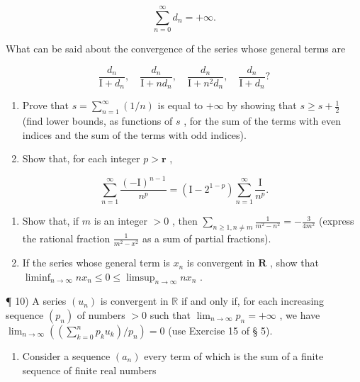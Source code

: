 \[
\sum_ {n = 0} ^ {\infty} d _ {n} = + \infty .
\]

What can be said about the convergence of the series whose general terms are

\[
\frac {d _ {n}}{\mathrm{I} + d _ {n}}, \quad \frac {d _ {n}}{\mathrm{I} + n d _ {n}}, \quad \frac {d _ {n}}{\mathrm{I} + n ^ {2} d _ {n}}, \quad \frac {d _ {n}}{\mathrm{I} + d _ {n}}?
\]

\begin{enumerate}
\def\labelenumi{\arabic{enumi})}
\setcounter{enumi}{5}
\item
  Prove that \(s = \sum_{n=1}^{\infty} (1/n)\) is equal to \(+\infty\) by showing that \(s \geqslant s + \frac{1}{2}\) (find lower bounds, as functions of \(s\) , for the sum of the terms with even indices and the sum of the terms with odd indices).
\item
  Show that, for each integer \(p > \mathbf{r}\) ,
\end{enumerate}

\[
\sum_ {n = 1} ^ {\infty} \frac {(- \mathrm{I}) ^ {n - 1}}{n ^ {p}} = (\mathrm{I} - 2 ^ {1 - p}) \sum_ {n = 1} ^ {\infty} \frac {\mathrm{I}}{n ^ {p}}.
\]

\begin{enumerate}
\def\labelenumi{\arabic{enumi})}
\setcounter{enumi}{7}
\item
  Show that, if \(m\) is an integer \(> 0\) , then \(\sum_{n \geqslant 1, n \neq m} \frac{1}{m^2 - n^2} = -\frac{3}{4m^2}\) (express the rational fraction \(\frac{1}{m^2 - x^2}\) as a sum of partial fractions).
\item
  If the series whose general term is \(x_{n}\) is convergent in \(\mathbf{R}\) , show that \(\liminf_{n\to \infty}nx_n\leqslant 0\leqslant \limsup_{n\to \infty}nx_n\) .
\end{enumerate}

¶ 10) A series \((u_n)\) is convergent in \(\mathbb{R}\) if and only if, for each increasing sequence \((p_n)\) of numbers \(>0\) such that \(\lim_{n\to \infty}p_n = +\infty\) , we have \(\lim_{n\to \infty}\left(\left(\sum_{k=0}^{n}p_ku_k\right) / p_n\right) = 0\) (use Exercise 15 of § 5).

\begin{enumerate}
\def\labelenumi{\arabic{enumi})}
\setcounter{enumi}{10}
\tightlist
\item
  Consider a sequence \((a_{n})\) every term of which is the sum of a finite sequence of finite real numbers
\end{enumerate}

